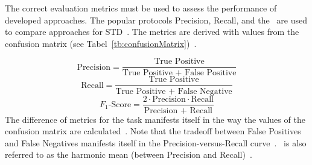 The correct evaluation metrics must be used to assess the performance of developed approaches.
The popular protocols Precision, Recall, and the \fone\ are used to compare
approaches for \ac{STD}~\citep{long_scene_2021}.
The metrics are derived with values from the confusion matrix (see
Tabel~\ref{tb:confusionMatrix})~\citep{davis_relationship_2006}.
\begin{table}[ht]
    \centering\scriptsize
    \caption{Confusion matrix\label{tb:confusionMatrix}}
\end{table}
\begin{equation}\label{eq:P}
    \text{Precision}=\frac{\text{True Positive}}{\text{True Positive + False Positive}}
\end{equation}
\begin{equation}\label{eq:R}
    \text{Recall}=\frac{\text{True Positive}}{\text{True Positive + False Negative}}
\end{equation}
\begin{equation}\label{eq:f1}
    F_1\text{-Score}=\frac{2\cdot \text{Precision}\cdot \text{Recall}}{\text{Precision + Recall}}
\end{equation}
The difference of metrics for the task manifests itself in the way the values of the confusion matrix
are calculated~\citep{long_scene_2021}.
Note that the tradeoff between False Positives and False Negatives manifests itself in the
Precision-versus-Recall curve~\citep{su_relationship_2015}.
\fone\ is also referred to as the harmonic mean (between Precision and
Recall)~\citep{he_icpr2018_2018}.
